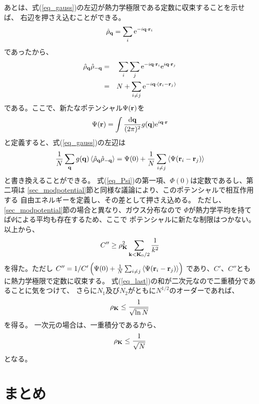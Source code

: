 \documentclass{jarticle}
\renewcommand{\v}[1]{{\bf #1}}
\newcommand{\ave}[1]{\left< #1 \right>}
\newcommand{\hr}{\hat{\rho}}
\begin{document}
あとは、式(\ref{eq_gauss})の左辺が熱力学極限である定数に収束することを示せば、
右辺を押さえ込むことができる。
\begin{equation}
  \hr_{\v{q}} = \sum_i \mbox{e}^{-i \v{q}\cdot\v{r}_i}
\end{equation}
であったから、
\begin{eqnarray}
  \hr_{\v{q}}\hr_{-\v{q}} &=& \sum_i \sum_j \mbox{e}^{-i \v{q}\cdot\v{r}_i} \mbox{e}^{i \v{q}\cdot\v{r}_j} \\
  &=& N + \sum_{i \neq j} \mbox{e}^{-i \v{q}\cdot(\v{r}_i-\v{r}_j)}
\end{eqnarray}
である。ここで、新たなポテンシャル$\Psi(\v{r})$を
\begin{equation}
  \Psi(\v{r}) = \int \frac{\mbox{d}\v{q}}{(2\pi)^2} g(\v{q}) \mbox{e}^{i \v{q}\cdot\v{r}}
\end{equation}
と定義すると、式(\ref{eq_gauss})の左辺は
\begin{equation}
  \frac{1}{N} \sum_{\v{q}} g(\v{q}) \ave{\hr_{\v{q}}\hr_{-\v{q}}}
  =
  \Psi(0) + \frac{1}{N} \sum_{i \neq j} \ave{\Psi(\v{r}_i-\v{r}_j)}
  \label{eq_Psi}
\end{equation}
と書き換えることができる。
式(\ref{eq_Psi})の第一項、$\Phi(0)$は定数であるし、第二項は
\ref{sec_modpotential}節と同様な議論により、このポテンシャルで相互作用する
自由エネルギーを定義し、その差として押さえ込める。
ただし、\ref{sec_modpotential}節の場合と異なり、ガウス分布なので
$\Phi$が熱力学平均を持てば$\Psi$による平均も存在するため、ここで
ポテンシャルに新たな制限はつかない。
以上から、
\begin{equation}
  C'' \ge \rho_{\v{K}}^2 \sum_{\v{k}<\v{K}_0/2} \frac{1}{k^2}
  \label{eq_last}
\end{equation}
を得た。ただし
$C'' = 1/C' \left(\Psi(0) + \frac{1}{N} \sum_{i \neq j} \ave{\Psi(\v{r}_i-\v{r}_j)}\right)$
であり、$C'$、$C''$ともに熱力学極限で定数に収束する。
式(\ref{eq_last})の和が二次元なので二重積分であることに気をつけて、
さらに$N_1$及び$N_2$がともに$N^{1/2}$のオーダーであれば、
\begin{equation}
  \rho_{\v{K}} \le \frac{1}{\sqrt{\ln{N}}}
\end{equation}
を得る。
一次元の場合は、一重積分であるから、
\begin{equation}
  \rho_\v{K} \le \frac{1}{\sqrt{N}}
\end{equation}
となる。

\section{まとめ}
\end{document}
